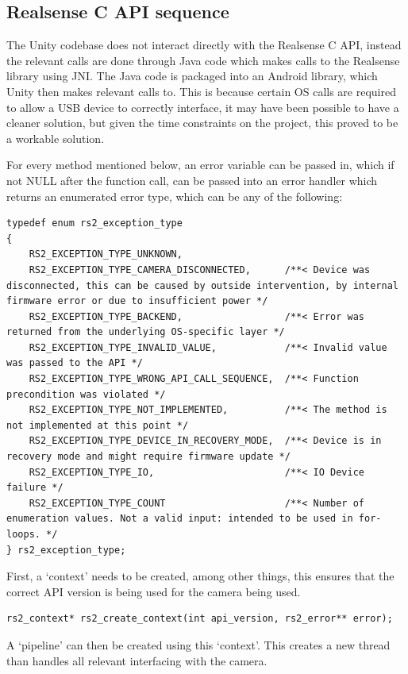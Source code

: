     \subsection{Realsense C API sequence}
    The Unity codebase does not interact directly with the Realsense C API, instead the relevant calls are done through Java code which makes calls to the Realsense library using JNI. The Java code is packaged into an Android library, which Unity then makes relevant calls to. This is because certain OS calls are required to allow a USB device to correctly interface, it may have been possible to have a cleaner solution, but given the time constraints on the project, this proved to be a workable solution.

    For every method mentioned below, an error variable can be passed in, which if not NULL after the function call, can be passed into an error handler which returns an enumerated error type, which can be any of the following:

    \begin{lstlisting}[style=CStyle]
typedef enum rs2_exception_type
{
    RS2_EXCEPTION_TYPE_UNKNOWN,
    RS2_EXCEPTION_TYPE_CAMERA_DISCONNECTED,      /**< Device was disconnected, this can be caused by outside intervention, by internal firmware error or due to insufficient power */
    RS2_EXCEPTION_TYPE_BACKEND,                  /**< Error was returned from the underlying OS-specific layer */
    RS2_EXCEPTION_TYPE_INVALID_VALUE,            /**< Invalid value was passed to the API */
    RS2_EXCEPTION_TYPE_WRONG_API_CALL_SEQUENCE,  /**< Function precondition was violated */
    RS2_EXCEPTION_TYPE_NOT_IMPLEMENTED,          /**< The method is not implemented at this point */
    RS2_EXCEPTION_TYPE_DEVICE_IN_RECOVERY_MODE,  /**< Device is in recovery mode and might require firmware update */
    RS2_EXCEPTION_TYPE_IO,                       /**< IO Device failure */
    RS2_EXCEPTION_TYPE_COUNT                     /**< Number of enumeration values. Not a valid input: intended to be used in for-loops. */
} rs2_exception_type;\end{lstlisting}

    First, a `context' needs to be created, among other things, this ensures that the correct API version is being used for the camera being used.
    \begin{lstlisting}[style=CStyle]
rs2_context* rs2_create_context(int api_version, rs2_error** error);\end{lstlisting}

    A `pipeline' can then be created using this `context'. This creates a new thread than handles all relevant interfacing with the camera.

